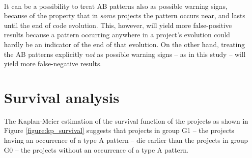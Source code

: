 \paragraph{}
It can be a possibility to treat AB patterns also as possible warning signs,
because of the property that in \textit{some} projects the pattern occurs near,
and lasts until the end of code evolution. This, however, will yield more
false-positive results because a pattern occurring anywhere in a project's
evolution could hardly be an indicator of the end of that evolution.
On the other hand, treating the AB patterns explicitly \textit{not} as possible
warning signs -- as in this study -- will yield more false-negative results.

\section{Survival analysis}
\label{section:kp_survival}
The Kaplan-Meier estimation of the survival function of the projects as shown
in Figure \ref{figure:kp_survival} suggests that projects in group G1 -- the
projects having an occurrence of a type A pattern -- die earlier than the
projects in group G0 -- the projects without an occurrence of a type A pattern.

\paragraph{}


\begin{comment}
More about:
- How come G1 have higher survival chances in the first year?
- How come G1 and G0 have equal chances between 3.2 and 3.8 years?
\end{comment}


